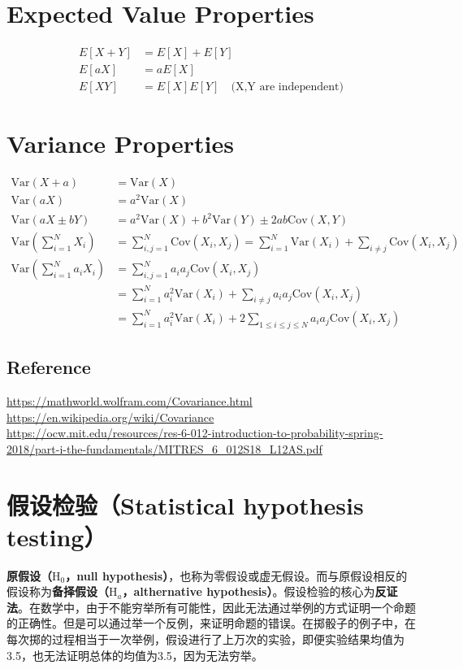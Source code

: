 \documentclass[11pt]{article}
\begin{document}
\section{Expected Value Properties}
\noindent
\begin{align*}
    E[X+Y] &= E[X] + E[Y] \\
    E[aX] &= a E[X] \\
    E[XY] &= E[X]E[Y] \quad \text{(X,Y are independent)}
\end{align*}

\section{Variance Properties}
\noindent
\begin{align*}
    \text{Var}(X + a) &= \text{Var}(X) \\
    \text{Var}(aX) &= a^2\text{Var}(X) \\
    \text{Var}(aX \pm bY) &= a^2\text{Var}(X) + b^2\text{Var}(Y) \pm 2ab \text{Cov}(X,Y) \\
    \text{Var}(\sum_{i=1}^{N} X_i) &= \sum_{i,j=1}^{N}\text{Cov}(X_i,X_j) = \sum_{i=1}^{N}\text{Var}(X_i) + \sum_{i \neq j}\text{Cov}(X_i,X_j) \\
    \text{Var}(\sum_{i=1}^{N} a_i X_i) &= \sum_{i,j=1}^{N}a_i a_j\text{Cov}(X_i,X_j) \\
    &= \sum_{i=1}^{N}a_i^2\text{Var}(X_i) + \sum_{i \neq j} a_i a_j \text{Cov}(X_i,X_j) \\
    &= \sum_{i=1}^{N}a_i^2\text{Var}(X_i) + 2\sum_{1 \leq i \leq j \leq N} a_i a_j \text{Cov}(X_i,X_j)
\end{align*}

\subsection*{Reference}
\url{https://mathworld.wolfram.com/Covariance.html}\\
\indent\url{https://en.wikipedia.org/wiki/Covariance}\\
\indent\url{https://ocw.mit.edu/resources/res-6-012-introduction-to-probability-spring-2018/part-i-the-fundamentals/MITRES_6_012S18_L12AS.pdf}

\section{假设检验（Statistical hypothesis testing）}

\textbf{原假设（$\text{H}_0$，null hypothesis）}，也称为零假设或虚无假设。而与原假设相反的假设称为\textbf{备择假设（$\text{H}_a$，althernative hypothesis）}。假设检验的核心为\textbf{反证法}。在数学中，由于不能穷举所有可能性，因此无法通过举例的方式证明一个命题的正确性。但是可以通过举一个反例，来证明命题的错误。在掷骰子的例子中，在每次掷的过程相当于一次举例，假设进行了上万次的实验，即便实验结果均值为3.5，也无法证明总体的均值为3.5，因为无法穷举。
\end{document}
